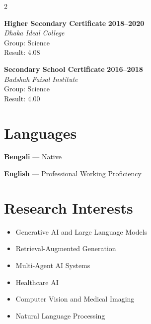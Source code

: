 \documentclass[10pt,a4paper]{article}
\begin{document}
\begin{multicols}{2}
\vspace{2mm}

\noindent
\textbf{Higher Secondary Certificate} \hfill \textbf{2018--2020} \\
\textit{Dhaka Ideal College} \\[1mm]
\small
Group: Science \\
Result: 4.08
\normalsize

\vspace{2mm}

\noindent
\textbf{Secondary School Certificate} \hfill \textbf{2016--2018} \\
\textit{Badshah Faisal Institute} \\[1mm]
\small
Group: Science \\
Result: 4.00
\normalsize


\section{Languages}

\textbf{Bengali} --- Native

\vspace{1mm}

\textbf{English} --- Professional Working Proficiency


\section{Research Interests}

\begin{itemize}

\item Generative AI and Large Language Models

\item Retrieval-Augmented Generation

\item Multi-Agent AI Systems

\item Healthcare AI

\item Computer Vision and Medical Imaging

\item Natural Language Processing


\end{itemize}
\end{multicols}
\end{document}
